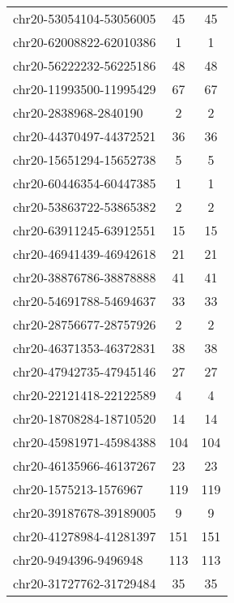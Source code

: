 \begin{longtable}{lSS}
	chr20-53054104-53056005 & 45     & 45                         \\
	chr20-62008822-62010386 & 1      & 1                          \\
	chr20-56222232-56225186 & 48     & 48                         \\
	chr20-11993500-11995429 & 67     & 67                         \\
	chr20-2838968-2840190   & 2      & 2                          \\
	chr20-44370497-44372521 & 36     & 36                         \\
	chr20-15651294-15652738 & 5      & 5                          \\
	chr20-60446354-60447385 & 1      & 1                          \\
	chr20-53863722-53865382 & 2      & 2                          \\
	chr20-63911245-63912551 & 15     & 15                         \\
	chr20-46941439-46942618 & 21     & 21                         \\
	chr20-38876786-38878888 & 41     & 41                         \\
	chr20-54691788-54694637 & 33     & 33                         \\
	chr20-28756677-28757926 & 2      & 2                          \\
	chr20-46371353-46372831 & 38     & 38                         \\
	chr20-47942735-47945146 & 27     & 27                         \\
	chr20-22121418-22122589 & 4      & 4                          \\
	chr20-18708284-18710520 & 14     & 14                         \\
	chr20-45981971-45984388 & 104    & 104                        \\
	chr20-46135966-46137267 & 23     & 23                         \\
	chr20-1575213-1576967   & 119    & 119                        \\
	chr20-39187678-39189005 & 9      & 9                          \\
	chr20-41278984-41281397 & 151    & 151                        \\
	chr20-9494396-9496948   & 113    & 113                        \\
	chr20-31727762-31729484 & 35     & 35                         \\

\end{longtable}
